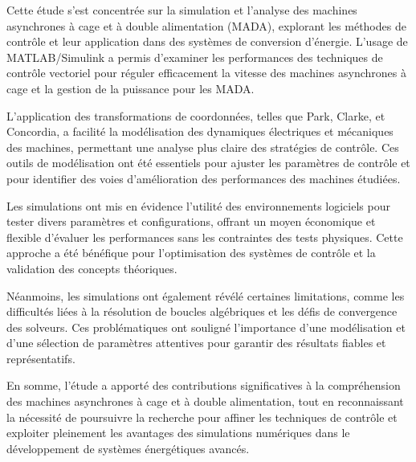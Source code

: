 
Cette étude s'est concentrée sur la simulation et l'analyse des machines asynchrones à cage et à double alimentation (MADA), explorant les méthodes de contrôle et leur application dans des systèmes de conversion d'énergie. L'usage de MATLAB/Simulink a permis d'examiner les performances des techniques de contrôle vectoriel pour réguler efficacement la vitesse des machines asynchrones à cage et la gestion de la puissance pour les MADA.

L'application des transformations de coordonnées, telles que Park, Clarke, et Concordia, a facilité la modélisation des dynamiques électriques et mécaniques des machines, permettant une analyse plus claire des stratégies de contrôle. Ces outils de modélisation ont été essentiels pour ajuster les paramètres de contrôle et pour identifier des voies d'amélioration des performances des machines étudiées.

Les simulations ont mis en évidence l'utilité des environnements logiciels pour tester divers paramètres et configurations, offrant un moyen économique et flexible d'évaluer les performances sans les contraintes des tests physiques. Cette approche a été bénéfique pour l'optimisation des systèmes de contrôle et la validation des concepts théoriques.

Néanmoins, les simulations ont également révélé certaines limitations, comme les difficultés liées à la résolution de boucles algébriques et les défis de convergence des solveurs. Ces problématiques ont souligné l'importance d'une modélisation et d'une sélection de paramètres attentives pour garantir des résultats fiables et représentatifs.

En somme, l'étude a apporté des contributions significatives à la compréhension des machines asynchrones à cage et à double alimentation, tout en reconnaissant la nécessité de poursuivre la recherche pour affiner les techniques de contrôle et exploiter pleinement les avantages des simulations numériques dans le développement de systèmes énergétiques avancés.